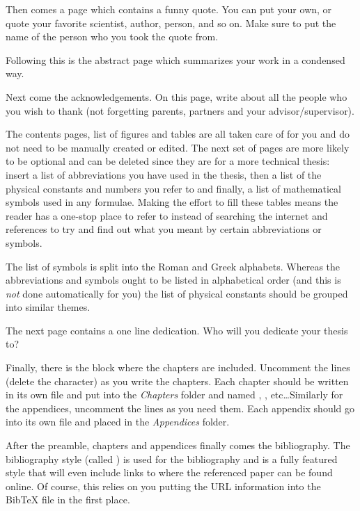 Then comes a page which contains a funny quote. You can put your own, or quote your favorite scientist, author, person, and so on. Make sure to put the name of the person who you took the quote from.

Following this is the abstract page which summarizes your work in a condensed way.

Next come the acknowledgements. On this page, write about all the people who you wish to thank (not forgetting parents, partners and your advisor/supervisor).

The contents pages, list of figures and tables are all taken care of for you and do not need to be manually created or edited. The next set of pages are more likely to be optional and can be deleted since they are for a more technical thesis: insert a list of abbreviations you have used in the thesis, then a list of the physical constants and numbers you refer to and finally, a list of mathematical symbols used in any formulae. Making the effort to fill these tables means the reader has a one-stop place to refer to instead of searching the internet and references to try and find out what you meant by certain abbreviations or symbols.

The list of symbols is split into the Roman and Greek alphabets. Whereas the abbreviations and symbols ought to be listed in alphabetical order (and this is \emph{not} done automatically for you) the list of physical constants should be grouped into similar themes.

The next page contains a one line dedication. Who will you dedicate your thesis to?

Finally, there is the block where the chapters are included. Uncomment the lines (delete the \code{\%} character) as you write the chapters. Each chapter should be written in its own file and put into the \emph{Chapters} folder and named , , etc\ldots Similarly for the appendices, uncomment the lines as you need them. Each appendix should go into its own file and placed in the \emph{Appendices} folder.

After the preamble, chapters and appendices finally comes the bibliography. The bibliography style (called ) is used for the bibliography and is a fully featured style that will even include links to where the referenced paper can be found online. Of course, this relies on you putting the URL information into the BibTeX file in the first place.


